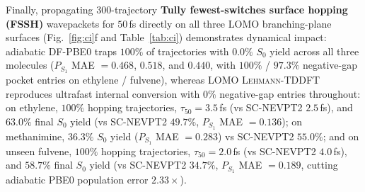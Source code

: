 \documentclass[10pt,twocolumn]{article}
\theoremstyle{natthm}
\newcommand{\leh}{\textsc{Lehmann-TDDFT}}
\begin{document}
Finally, propagating 300-trajectory \textbf{Tully fewest-switches surface hopping (FSSH)}\cite{tully1990fssh,subotnik2016fssh} wavepackets for $50$\,fs directly on all three LOMO branching-plane surfaces (Fig.~\ref{fig:ci}f and Table~\ref{tab:ci}) demonstrates dynamical impact: adiabatic DF-PBE0 traps $100\%$ of trajectories with $0.0\%$ $S_0$ yield across all three molecules ($P_{S_1}$ MAE $=0.468$, $0.518$, and $0.440$, with $100\%$ / $97.3\%$ negative-gap pocket entries on ethylene / fulvene), whereas LOMO \leh{} reproduces ultrafast internal conversion with $0\%$ negative-gap entries throughout: on ethylene, $100\%$ hopping trajectories, $\tau_{50}=3.5$\,fs (vs SC-NEVPT2 $2.5$\,fs), and $63.0\%$ final $S_0$ yield (vs SC-NEVPT2 $49.7\%$, $P_{S_1}$ MAE $=0.136$); on methanimine, $36.3\%$ $S_0$ yield ($P_{S_1}$ MAE $=0.283$) vs SC-NEVPT2 $55.0\%$; and on unseen fulvene, $100\%$ hopping trajectories, $\tau_{50}=2.0$\,fs (vs SC-NEVPT2 $4.0$\,fs), and $58.7\%$ final $S_0$ yield (vs SC-NEVPT2 $34.7\%$, $P_{S_1}$ MAE $=0.189$, cutting adiabatic PBE0 population error $2.33\times$).
\end{document}
